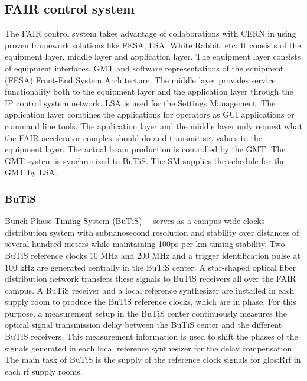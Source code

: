 \subsection{FAIR control system}
The \gls{FAIR} control system takes advantage of collaborations with CERN in using proven framework solutions like FESA, LSA, White Rabbit, etc. It consists of the equipment layer, middle layer and application layer. The equipment layer consists of equipment interfaces, GMT and software representations of the equipment
(FESA) Front-End System Architecture. The middle layer provides service functionality both to the equipment layer and the application layer through the IP control system network. LSA is used for the Settings Management. The application layer combines the applications for operators as GUI applications or command line tools. The application layer and the middle layer only request what the FAIR accelerator complex should do and transmit set values to the equipment layer. The actual beam production is controlled by the GMT. The GMT system is synchronized to BuTiS. The \gls{SM} supplies the schedule for the GMT by LSA.

\subsubsection{BuTiS}
Bunch Phase Timing System (BuTiS)~\cite{moritz_butisdevelopment_2006}~\cite{zipfel_recent_2011} serves as a campus-wide clocks distribution system with subnanosecond resolution and stability over distances of several hundred meters while maintaining 100ps per km timing stability. Two BuTiS reference clocks 10 MHz and 200 MHz and a trigger identification pulse at 100 kHz are generated centrally in the BuTiS center. A star-shaped optical fiber distribution network transfers these signals to BuTiS receivers all over the FAIR campus. A BuTiS receiver and a local reference synthesizer are installed in each supply room to produce the BuTiS reference clocks, which are in phase. For this purpose, a measurement setup in the BuTiS center continuously measures the optical signal transmission delay between the BuTiS center and the different BuTiS receivers. This measurement information is used to shift the phases of the signals generated in each local reference synthesizer for the delay compensation. The main task of BuTiS is the supply of the reference clock signals for \gls{glos:Rrf} in each rf supply rooms.

